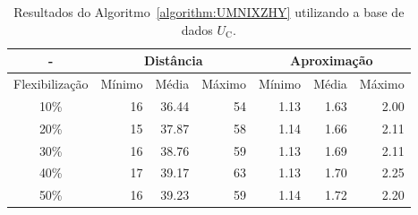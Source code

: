 \begin{table}[!htb]
  \caption{Resultados do Algoritmo~\ref{algorithm:UMNIXZHY} utilizando a base de dados $U_{\text{C}}$.}
  \label{table:CMSNUCXZ}
  \centering
  \begin{tabular}{|c|r|r|r|r|r|r|}
    \hline
      -            & \multicolumn{3}{c|}{Distância}             & \multicolumn{3}{c|}{Aproximação}           \\ \hline
    Flexibilização & Mínimo       & Média        & Máximo       & Mínimo       & Média        & Máximo       \\ \hline  
    10\%           & 16           & 36.44        & 54           & 1.13         & 1.63         & 2.00         \\ \hline
    20\%           & 15           & 37.87        & 58           & 1.14         & 1.66         & 2.11         \\ \hline
    30\%           & 16           & 38.76        & 59           & 1.13         & 1.69         & 2.11         \\ \hline
    40\%           & 17           & 39.17        & 63           & 1.13         & 1.70         & 2.25         \\ \hline
    50\%           & 16           & 39.23        & 59           & 1.14         & 1.72         & 2.20         \\ \hline    
  \end{tabular}
\end{table}